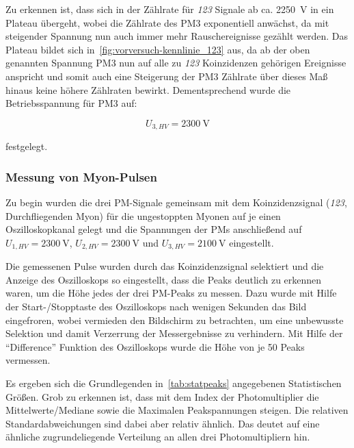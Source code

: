 \documentclass[slug=LM, room=Andreas-Schubert-Bau\,\ K\ 1A, supervisor=Anne-Sophie\ Berthold, coursedate=13.\ 12.\ 2019]{../../Lab_Report_LaTeX/lab_report}
\begin{document}
Zu erkennen ist, dass sich in der Z\"ahlrate f\"ur \textit{123}
Signale ab ca. \SI{2250}{\volt} in ein Plateau \"ubergeht, wobei die
Z\"ahlrate des PM3 exponentiell anw\"achst, da mit steigender Spannung
nun auch immer mehr Rauschereignisse gez\"ahlt werden. Das Plateau
bildet sich in~\ref{fig:vorversuch-kennlinie_123} aus, da ab der oben
genannten Spannung PM3 nun auf alle zu \textit{123} Koinzidenzen
geh\"origen Ereignisse anspricht und somit auch eine Steigerung der
PM3 Z\"ahlrate \"uber dieses Ma\ss{} hinaus keine h\"ohere Z\"ahlraten
bewirkt. Dementsprechend wurde die Betriebsspannung f\"ur PM3 auf:

\begin{equation}
  \label{eq:bspann}
  U_{3,HV} = \SI{2300}{\volt}
\end{equation}

festgelegt.

\subsubsection{Messung von Myon-Pulsen}
\label{sec:pulse}

Zu begin wurden die drei PM-Signale gemeinsam mit dem Koinzidenzsignal
(\textit{123}, Durchfliegenden Myon) für die ungestoppten Myonen auf je einen
Oszilloskopkanal gelegt und die Spannungen der PMs anschließend auf
\(U_{1,HV} = \SI{2300}{\volt}\), \(U_{2,HV} = \SI{2300}{\volt}\) und
\(U_{3,HV} = \SI{2100}{\volt}\) eingestellt.

Die gemessenen Pulse wurden durch das Koinzidenzsignal selektiert und
die Anzeige des Oszilloskops so eingestellt, dass die Peaks deutlich
zu erkennen waren, um die Höhe jedes der drei PM-Peaks zu messen. Dazu
wurde mit Hilfe der Start-/Stopptaste des Oszilloskops nach wenigen
Sekunden das Bild eingefroren, wobei vermieden den Bildschirm zu
betrachten, um eine unbewusste Selektion und damit Verzerrung der
Messergebnisse zu verhindern. Mit Hilfe der ``Difference'' Funktion
des Oszilloskops wurde die Höhe von je 50 Peaks vermessen.

Es ergeben sich die Grundlegenden in~\ref{tab:statpeaks} angegebenen
Statistischen Gr\"o\ss{}en. Grob zu erkennen ist, dass mit dem Index
der Photomultiplier die Mittelwerte/Mediane sowie die Maximalen
Peakspannungen steigen. Die relativen Standardabweichungen sind dabei
aber relativ \"ahnlich. Das deutet auf eine \"ahnliche
zugrundeliegende Verteilung an allen drei Photomultipliern hin.
\end{document}
